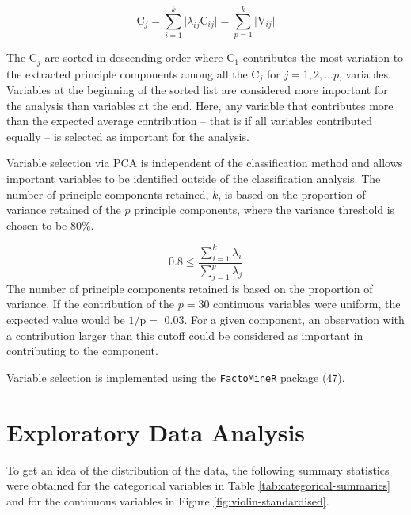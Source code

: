 \documentclass[12pt,]{article}
\begin{document}
\[
\text{C}_j = \sum^k_{i=1} \vert \lambda_{ij} \text{C}_{ij} \vert = \sum^k_{p=1} \vert \text{V}_{ij} \vert   \tag{10}
\]

The \(\text{C}_j\) are sorted in descending order where \(\text{C}_1\)
contributes the most variation to the extracted principle components
among all the \(\text{C}_j\) for \(j=1,2,...p\), variables. Variables at
the beginning of the sorted list are considered more important for the
analysis than variables at the end. Here, any variable that contributes
more than the expected average contribution -- that is if all variables
contributed equally -- is selected as important for the analysis.

Variable selection via PCA is independent of the classification method
and allows important variables to be identified outside of the
classification analysis. The number of principle components retained,
\(k\), is based on the proportion of variance retained of the \(p\)
principle components, where the variance threshold is chosen to be 80\%.

\[
0.8 \leq \frac{\sum^k_{i=1} \lambda_i}{\sum^p_{j=1} \lambda_j}  \tag{11}
\] The number of principle components retained is based on the
proportion of variance. If the contribution of the \(p=30\) continuous
variables were uniform, the expected value would be \(1/\text{p} =\)
0.03. For a given component, an observation with a contribution larger
than this cutoff could be considered as important in contributing to the
component.

Variable selection is implemented using the \texttt{FactoMineR} package
(\protect\hyperlink{ref-husson_factominer:_2019}{47}).

\newpage

\section{Exploratory Data Analysis}\label{exploratory-data-analysis}

To get an idea of the distribution of the data, the following summary
statistics were obtained for the categorical variables in Table
\ref{tab:categorical-summaries} and for the continuous variables in
Figure \ref{fig:violin-standardised}.
\end{document}
